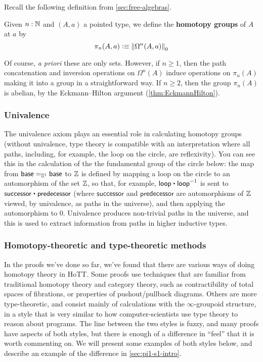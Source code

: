 Recall the following definition from \autoref{sec:free-algebras}.

\begin{defn}\label{def-of-homotopy-groups}
  Given $n:\N$ and $(A,a)$ a pointed type, we define the \textbf{homotopy groups} of $A$
  at $a$ by
  \[\pi_n(A,a)\defeq \trunc0{\Omega^n(A,a)}\]
\end{defn}

Of course, \emph{a priori} these are only sets.
However, if $n\ge 1$, then the path concatenation and inversion operations on $\Omega^n(A)$ induce operations on $\pi_n(A)$ making it into a group in a straightforward way.
If $n\ge 2$, then the group $\pi_n(A)$ is abelian, by the Eckmann--Hilton argument (\autoref{thm:EckmannHilton}).


\subsubsection{Univalence}  The univalence axiom plays an essential role in
  calculating homotopy groups (without univalence, type theory is
  compatible with an interpretation where all paths, including, for
  example, the loop on the circle, are reflexivity).  You can see this
  in the calculation of the the fundamental group of the circle below:
  the map from $\id[\Sn ^1] \base \base$ to $\Z$ is defined by mapping a
  loop on the circle to an automorphism of the set $\Z$, so that, for
  example, $\lloop \ct \opp \lloop$ is sent to $\mathsf{successor} \ct
  \mathsf{predecessor}$ (where $\mathsf{successor}$ and
  $\mathsf{predecessor}$ are automorphisms of $\Z$ viewed, by
  univalence, as paths in the universe), and then applying the
  automorphism to 0. Univalence produces non-trivial paths in the
  universe, and this is used to extract information from paths in higher
  inductive types.

\subsubsection{Homotopy-theoretic and type-theoretic methods}  In the
proofs we've done so far, we've found that there are various ways of
doing homotopy theory in HoTT.  Some proofs use techniques that are
familiar from traditional homotopy theory and category theory, such as
contractibility of total spaces of fibrations, or properties of
pushout/pullback diagrams.  Others are more type-theoretic, and consist
mainly of calculations with the $\infty$-groupoid structure, in a style
that is very similar to how computer-scientists use type theory to
reason about programs.  The line between the two styles is fuzzy, and
many proofs have aspects of both styles, but there is enough of a
difference in ``feel'' that it is worth commenting on.  We will present
some examples of both styles below, and describe an example of the
difference in \autoref{sec:pi1-s1-intro}.

